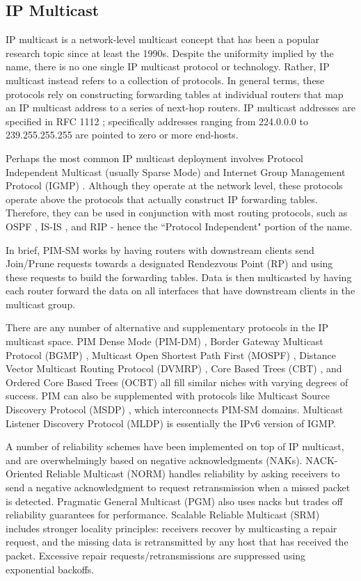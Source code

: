 \subsection{IP Multicast}
\label{ip-multicast}
IP multicast is a network-level multicast concept that has been a popular research topic since at least the 1990s. Despite the uniformity implied by the name, there is no one single IP multicast protocol or technology. Rather, IP multicast instead refers to a collection of protocols. In general terms, these protocols rely on constructing forwarding tables at individual routers that map an IP multicast address to a series of next-hop routers. IP multicast addresses are specified in RFC 1112 \cite{RFC1112}; specifically addresses ranging from 224.0.0.0 to 239.255.255.255 are pointed to zero or more end-hosts.

Perhaps the most common IP multicast deployment involves Protocol Independent Multicast (usually Sparse Mode) \cite{RFC2362} and Internet Group Management Protocol (IGMP) \cite{RFC4605}. Although they operate at the network level, these protocols operate above the protocols that actually construct IP forwarding tables. Therefore, they can be used in conjunction with most routing protocols, such as OSPF \cite{RFC2328}, IS-IS \cite{ISO10589}, and RIP \cite{RFC2453} - hence the ``Protocol Independent" portion of the name. 

In brief, PIM-SM works by having routers with downstream clients send Join/Prune requests towards a designated Rendezvous Point (RP) and using these requests to build the forwarding tables. Data is then multicasted by having each router forward the data on all interfaces that have downstream clients in the multicast group.

There are any number of alternative and supplementary protocols in the IP multicast space. PIM Dense Mode (PIM-DM) \cite{RFC3973}, Border Gateway Multicast Protocol (BGMP) \cite{RFC3913}, Multicast Open Shortest Path First (MOSPF) \cite{RFC1584}, Distance Vector Multicast Routing Protocol (DVMRP) \cite{RFC1075}, Core Based Trees (CBT) \cite{RFC2201}, and Ordered Core Based Trees (OCBT) \cite{OCBT} all fill similar niches with varying degrees of success.  PIM can also be supplemented with protocols like Multicast Source Discovery Protocol (MSDP) \cite{RFC4611}, which interconnects PIM-SM domains. Multicast Listener Discovery Protocol (MLDP) \cite{RFC4604} is essentially the IPv6 version of IGMP.

A number of reliability schemes have been implemented on top of IP multicast, and are overwhelmingly based on negative acknowledgments (NAKs). NACK-Oriented Reliable Multicast (NORM) \cite{RFC5740} handles reliability by asking receivers to send a negative acknowledgment to request retransmission when a missed packet is detected. Pragmatic General Multicast (PGM) \cite{RFC3208} also uses nacks but trades off reliability guarantees for performance. Scalable Reliable Multicast (SRM) \cite{SRM} includes stronger locality principles: receivers recover by multicasting a repair request, and the missing data is retransmitted by any host that has received the packet.  Excessive repair requests/retransmissions are suppressed using exponential backoffs.

